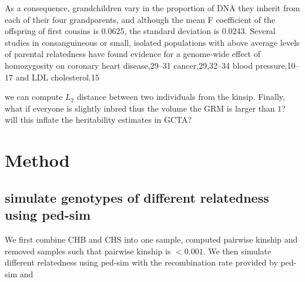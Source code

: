\documentclass[11pt,Times]{article}
\begin{document}
As a consequence, grandchildren vary in the proportion of DNA they inherit from each of their four grandparents, and although the mean F coefficient of the offspring of first cousins is 0.0625, the standard deviation is 0.0243.
Several studies in consanguineous or small, isolated populations with above average levels of parental relatedness have found evidence for a genome-wide effect of homozygosity on coronary heart disease,29–31 cancer,29,32–34 blood pressure,10–17 and LDL cholesterol.15

we can compute $L_2$ distance between two individuals from the kinsip. 
Finally, what if everyone is slightly inbred thus the volume the GRM is larger than $1$? will this inflate the heritability estimates in GCTA? 

\newpage
\section{Method}
\subsection{simulate genotypes of different relatedness using ped-sim}
We first combine CHB and CHS into one sample, computed pairwise kinship and removed samples such that pairwise kinship is $< 0.001$. 
We then simulate different relatedness using ped-sim with the recombination rate provided by ped-sim and 


\end{document}
